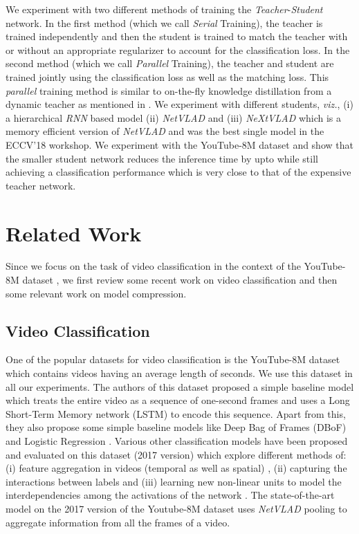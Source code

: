 \documentclass[10pt,twocolumn,letterpaper]{article}
\begin{document}
We experiment with two different methods of training the \textit{Teacher}-\textit{Student} network. In the first method (which we call \textit{Serial} Training), the teacher is trained independently and then the student is trained to match the teacher with or without an appropriate regularizer to account for the classification loss. In the second method (which we call \textit{Parallel} Training), the teacher and student are trained jointly using the classification loss as well as the matching loss. This \textit{parallel} training method is similar to on-the-fly knowledge distillation from a dynamic teacher as mentioned in \cite{parallel}. We experiment with different students, \textit{viz.}, (i) a hierarchical \textit{RNN} based model (ii) \textit{NetVLAD} and (iii) \textit{NeXtVLAD} which is a memory efficient version of \textit{NetVLAD} and was the best single model in the ECCV'18 workshop. We experiment with the YouTube-8M dataset and show that the smaller student network reduces the inference time by upto  while still achieving a classification performance which is very close to that of the expensive teacher network. 

\section{Related Work}
Since we focus on the task of video classification in the context of the YouTube-8M dataset \cite{Youtube8m}, we first review some recent work on video classification and then some relevant work on model compression.

\subsection{Video Classification} One of the popular datasets for video classification is the YouTube-8M dataset which contains videos having an average length of  seconds. We use this dataset in all our experiments. The authors of this dataset proposed a simple baseline model which treats the entire video as a sequence of one-second frames and uses a Long Short-Term Memory network (LSTM) to encode this sequence. Apart from this, they also propose some simple baseline models like Deep Bag of Frames (DBoF) and Logistic Regression \cite{Youtube8m}.
Various other classification models \cite{willow,monkey-typing,temporal-models-yt8m,aggregate-frame-features,deep-models-videos} have been proposed and evaluated on this dataset (2017 version) which explore different methods of: (i) feature aggregation in videos
(temporal as well as spatial) \cite{aggregate-frame-features,willow}, (ii) capturing the interactions between labels \cite{monkey-typing} and (iii) learning new non-linear units to model the interdependencies among the activations of the network \cite{willow}. The state-of-the-art model on the 2017 version of the Youtube-8M dataset uses \textit{NetVLAD} pooling \cite{willow} to aggregate information from all the frames of a video. 
\end{document}
